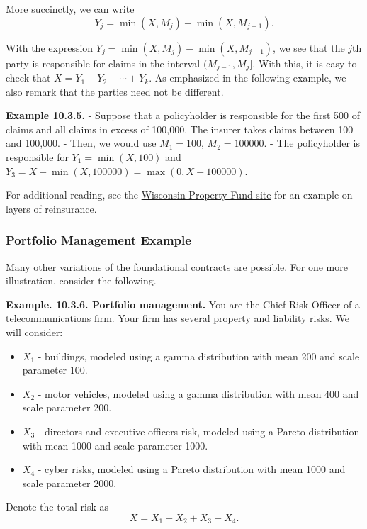 \documentclass[]{book}
\providecommand{\tightlist}{%
  \setlength{\itemsep}{0pt}\setlength{\parskip}{0pt}}
\theoremstyle{definition}
\theoremstyle{definition}
\theoremstyle{definition}
\theoremstyle{remark}
\begin{document}
More succinctly, we can write \[Y_j = \min(X,M_j) - \min(X,M_{j-1}) .\]

With the expression \(Y_j = \min(X,M_j) - \min(X,M_{j-1})\), we see that
the \(j\)th party is responsible for claims in the interval
\((M_{j-1}, M_j].\) With this, it is easy to check that
\(X = Y_1 + Y_2 + \cdots + Y_k.\) As emphasized in the following
example, we also remark that the parties need not be different.

\textbf{Example 10.3.5.} - Suppose that a policyholder is responsible
for the first 500 of claims and all claims in excess of 100,000. The
insurer takes claims between 100 and 100,000. - Then, we would use
\(M_1 = 100\), \(M_2 =100000\). - The policyholder is responsible for
\(Y_1 =\min(X,100)\) and
\(Y_3 = X - \min(X,100000) = \max(0, X-100000)\).

For additional reading, see the
\href{https://sites.google.com/a/wisc.edu/local-government-property-insurance-fund/home/reinsurance}{Wisconsin
Property Fund site} for an example on layers of reinsurance.

\subsubsection{Portfolio Management
Example}\label{portfolio-management-example}

Many other variations of the foundational contracts are possible. For
one more illustration, consider the following.

\textbf{Example. 10.3.6. Portfolio management.} You are the Chief Risk
Officer of a telecommunications firm. Your firm has several property and
liability risks. We will consider:

\begin{itemize}
\tightlist
\item
  \(X_1\) - buildings, modeled using a gamma distribution with mean 200
  and scale parameter 100.
\item
  \(X_2\) - motor vehicles, modeled using a gamma distribution with mean
  400 and scale parameter 200.
\item
  \(X_3\) - directors and executive officers risk, modeled using a
  Pareto distribution with mean 1000 and scale parameter 1000.
\item
  \(X_4\) - cyber risks, modeled using a Pareto distribution with mean
  1000 and scale parameter 2000.
\end{itemize}

Denote the total risk as \[X = X_1 + X_2 + X_3 + X_4 .\]
\end{document}
